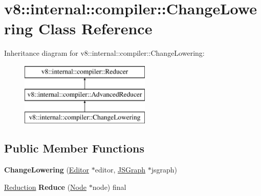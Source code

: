 \hypertarget{classv8_1_1internal_1_1compiler_1_1_change_lowering}{}\section{v8\+:\+:internal\+:\+:compiler\+:\+:Change\+Lowering Class Reference}
\label{classv8_1_1internal_1_1compiler_1_1_change_lowering}
Inheritance diagram for v8\+:\+:internal\+:\+:compiler\+:\+:Change\+Lowering\+:\begin{figure}[H]
\begin{center}
\leavevmode
\includegraphics[height=3.000000cm]{classv8_1_1internal_1_1compiler_1_1_change_lowering}
\end{center}
\end{figure}
\subsection*{Public Member Functions}
\begin{DoxyCompactItemize}
\item 
{\bfseries Change\+Lowering} (\hyperlink{classv8_1_1internal_1_1compiler_1_1_advanced_reducer_1_1_editor}{Editor} $\ast$editor, \hyperlink{classv8_1_1internal_1_1compiler_1_1_j_s_graph}{J\+S\+Graph} $\ast$jsgraph)\hypertarget{classv8_1_1internal_1_1compiler_1_1_change_lowering_a655b76f7a81b956e929b484577924b4f}{}\label{classv8_1_1internal_1_1compiler_1_1_change_lowering_a655b76f7a81b956e929b484577924b4f}

\item 
\hyperlink{classv8_1_1internal_1_1compiler_1_1_reduction}{Reduction} {\bfseries Reduce} (\hyperlink{classv8_1_1internal_1_1compiler_1_1_node}{Node} $\ast$node) final\hypertarget{classv8_1_1internal_1_1compiler_1_1_change_lowering_ab41eac06ea6b2198c07de4698696ef3f}{}\label{classv8_1_1internal_1_1compiler_1_1_change_lowering_ab41eac06ea6b2198c07de4698696ef3f}

\end{DoxyCompactItemize}
